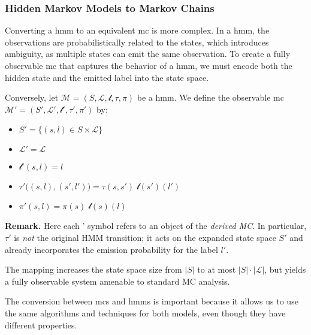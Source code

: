 \subsubsection{Hidden Markov Models to Markov Chains}\label{subsec:hmm2mc}
Converting a \gls{hmm} to an equivalent \gls{mc} is more complex.
In a \gls{hmm}, the observations are probabilistically related to the states, which introduces ambiguity, as multiple states can emit the same observation.
To create a fully observable \gls{mc} that captures the behavior of a \gls{hmm}, we must encode both the hidden state and the emitted label into the state space.
\begin{definition}
    Conversely, let
    \(
    \mathcal{M}
    = (S, \mathcal{L}, \mathscr{l}, \tau, \pi)
    \)
    be a \gls{hmm}.
    We define the observable \gls{mc}
    \(
    \mathcal{M}'
    = (S', \mathcal{L}', \mathscr{l}', \tau', \pi')
    \)
    by:
    \begin{itemize}
        \item $S' = \{(s,l)\in S\times\mathcal{L}\}$%
        \item $\mathcal{L}' = \mathcal{L}$%
        \item $\mathscr{l}'(s,l) = l$%
        \item $\tau'\big((s,l),(s',l')\big) = \tau(s,s')\;\mathscr{l}(s')(l')$%
        \item $\pi'(s,l) = \pi(s)\;\mathscr{l}(s)(l)$%
    \end{itemize}
    \textbf{Remark.}
    Here each ' symbol refers to an object of the \emph{derived MC}.  In
    particular, $\tau'$ is \emph{not} the original HMM transition; it acts on the
    expanded state space $S'$ and already incorporates the emission probability for
    the label $l'$.

    The mapping increases the state space size from $|S|$ to at most
    $|S|\cdot|\mathcal{L}|$, but yields a fully observable system amenable to
    standard MC analysis.
\end{definition}

The conversion between \glspl{mc} and \glspl{hmm} is important because it allows us to use the same algorithms and techniques for both models, even though they have different properties.

